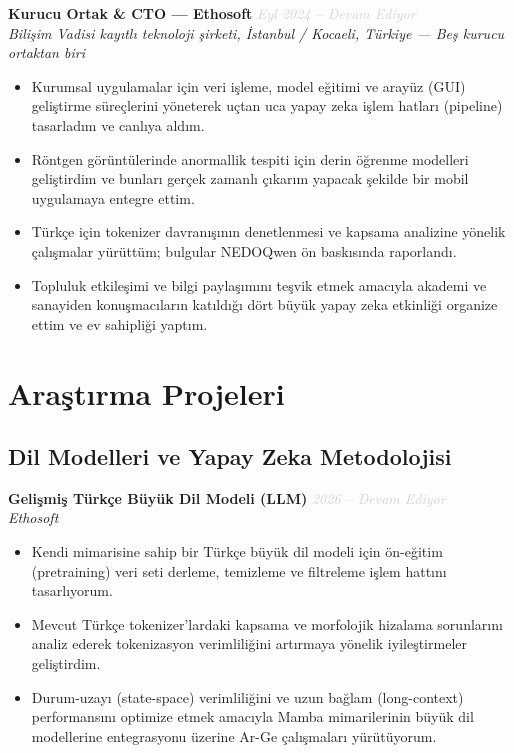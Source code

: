 \documentclass[11pt,a4paper]{article}
\newcommand{\blueitem}[1]{\textcolor{subtitleblue}{\textbf{#1}}}
\newcommand{\daterange}[1]{\hfill \textcolor{lightgray}{\textit{#1}}}
\begin{document}
\blueitem{Kurucu Ortak \& CTO --- Ethosoft} \daterange{Eyl 2024 -- Devam Ediyor}\\
\textit{Bilişim Vadisi kayıtlı teknoloji şirketi, İstanbul / Kocaeli, Türkiye --- Beş kurucu ortaktan biri}
\begin{itemize}
    \item Kurumsal uygulamalar için veri işleme, model eğitimi ve arayüz (GUI) geliştirme süreçlerini yöneterek uçtan uca yapay zeka işlem hatları (pipeline) tasarladım ve canlıya aldım.
    \item Röntgen görüntülerinde anormallik tespiti için derin öğrenme modelleri geliştirdim ve bunları gerçek zamanlı çıkarım yapacak şekilde bir mobil uygulamaya entegre ettim.
    \item Türkçe için tokenizer davranışının denetlenmesi ve kapsama analizine yönelik çalışmalar yürüttüm; bulgular NEDOQwen ön baskısında raporlandı.
    \item Topluluk etkileşimi ve bilgi paylaşımını teşvik etmek amacıyla akademi ve sanayiden konuşmacıların katıldığı dört büyük yapay zeka etkinliği organize ettim ve ev sahipliği yaptım.
\end{itemize}

\section*{Araştırma Projeleri}

\subsection*{Dil Modelleri ve Yapay Zeka Metodolojisi}

\blueitem{Gelişmiş Türkçe Büyük Dil Modeli (LLM)} \daterange{2026 -- Devam Ediyor}\\
\textit{Ethosoft}
\begin{itemize}
    \item Kendi mimarisine sahip bir Türkçe büyük dil modeli için ön-eğitim (pretraining) veri seti derleme, temizleme ve filtreleme işlem hattını tasarlıyorum.
    \item Mevcut Türkçe tokenizer'lardaki kapsama ve morfolojik hizalama sorunlarını analiz ederek tokenizasyon verimliliğini artırmaya yönelik iyileştirmeler geliştirdim.
    \item Durum-uzayı (state-space) verimliliğini ve uzun bağlam (long-context) performansını optimize etmek amacıyla Mamba mimarilerinin büyük dil modellerine entegrasyonu üzerine Ar-Ge çalışmaları yürütüyorum.
\end{itemize}
\end{document}
